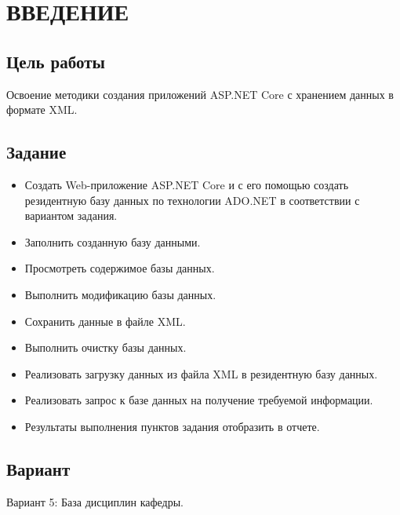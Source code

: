 \chapter{ВВЕДЕНИЕ}

\section{Цель работы}
Освоение методики создания приложений ASP.NET Core с хранением данных в формате XML.

\section{Задание}

\begin{itemize}
	\item Создать Web-приложение ASP.NET Core и с его помощью создать резидентную базу данных по технологии ADO.NET в соответствии с вариантом задания.
	\item Заполнить созданную базу данными.
	\item Просмотреть содержимое базы данных.
	\item Выполнить модификацию базы данных.
	\item Сохранить данные в файле XML.
	\item Выполнить очистку базы данных.
	\item Реализовать загрузку данных из файла XML в резидентную базу данных.
	\item Реализовать запрос к базе данных на получение требуемой информации.
	\item Результаты выполнения пунктов задания отобразить в отчете.
\end{itemize}

\section{Вариант}
Вариант 5: База дисциплин кафедры.